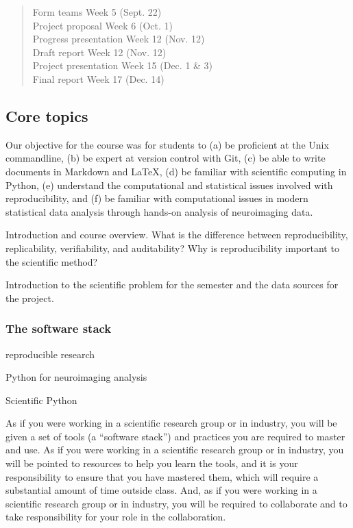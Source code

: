 \begin{quote}
\begin{flushleft}
Form teams \dotfill Week 5 (Sept. 22)\\
Project proposal \dotfill Week 6 (Oct. 1)\\
Progress presentation \dotfill Week 12 (Nov. 12)\\
Draft report \dotfill Week 12 (Nov. 12)\\
Project presentation \dotfill Week 15 (Dec. 1 \& 3)\\
Final report \dotfill Week 17 (Dec. 14)\\
\end{flushleft}
\end{quote}

\subsection{Core topics}

Our objective for the course was for students to
(a) be proficient at the Unix commandline,
(b) be expert at version control with Git,
(c) be able to write documents in Markdown and \LaTeX,
(d) be familiar with scientific computing in Python,
(e) understand the computational and statistical issues involved with reproducibility, and
(f) be familiar with computational issues in modern statistical data
analysis through hands-on analysis of neuroimaging data.


Introduction and course overview. What is the difference between
reproducibility, replicability, verifiability, and auditability? Why is
reproducibility important to the scientific method?

Introduction to the scientific problem for the semester
and the data sources for the project.


\subsubsection{The software stack}


reproducible research \citep{millman2014developing}

Python for neuroimaging analysis \citep{millman2007analysis}

Scientific Python \citep{millman2011python}

As if you were working in a scientific research group or in industry, you will
be given a set of tools (a ``software stack'') and practices you are required to
master and use. As if you were working in a scientific research group or in
industry, you will be pointed to resources to help you learn the tools, and it
is your responsibility to ensure that you have mastered them, which will
require a substantial amount of time outside class. And, as if you were working
in a scientific research group or in industry, you will be required to
collaborate and to take responsibility for your role in the collaboration.

